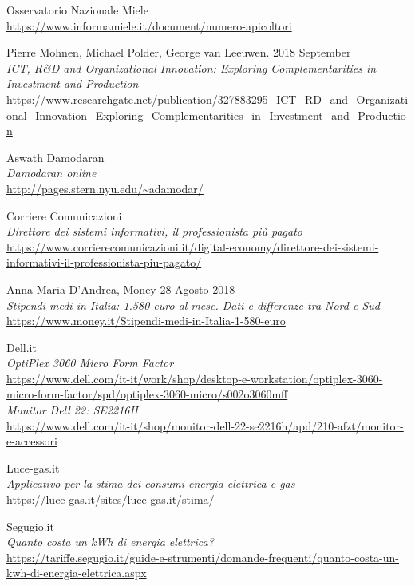 \newpage
\begin{thebibliography}{99}

Osservatorio Nazionale Miele \\
\url{https://www.informamiele.it/document/numero-apicoltori}

Pierre Mohnen, Michael Polder, George van Leeuwen. 2018 September\\
\emph{ICT, R\&D and Organizational Innovation: Exploring Complementarities in
Investment and Production} \\
\url{https://www.researchgate.net/publication/327883295_ICT_RD_and_Organizational_Innovation_Exploring_Complementarities_in_Investment_and_Production}

Aswath Damodaran \\
\emph{Damodaran online}\\
\url{http://pages.stern.nyu.edu/~adamodar/}

Corriere Comunicazioni \\
\emph{Direttore dei sistemi informativi, il professionista più pagato} \\
\url{https://www.corrierecomunicazioni.it/digital-economy/direttore-dei-sistemi-informativi-il-professionista-piu-pagato/}

Anna Maria D’Andrea, Money 28 Agosto 2018 \\
\emph{Stipendi medi in Italia: 1.580 euro al mese. Dati e differenze tra Nord e
Sud} \\
\url{https://www.money.it/Stipendi-medi-in-Italia-1-580-euro}

Dell.it \\
\emph{OptiPlex 3060 Micro Form Factor}\\
\url{https://www.dell.com/it-it/work/shop/desktop-e-workstation/optiplex-3060-micro-form-factor/spd/optiplex-3060-micro/s002o3060mff}
\\
\emph{Monitor Dell 22: SE2216H} \\
\url{https://www.dell.com/it-it/shop/monitor-dell-22-se2216h/apd/210-afzt/monitor-e-accessori}

Luce-gas.it \\
\emph{Applicativo per la stima dei consumi energia elettrica e gas}\\
\url{https://luce-gas.it/sites/luce-gas.it/stima/}

Segugio.it\\
\emph{Quanto costa un kWh di energia elettrica?}\\
\url{https://tariffe.segugio.it/guide-e-strumenti/domande-frequenti/quanto-costa-un-kwh-di-energia-elettrica.aspx}


\end{thebibliography}
